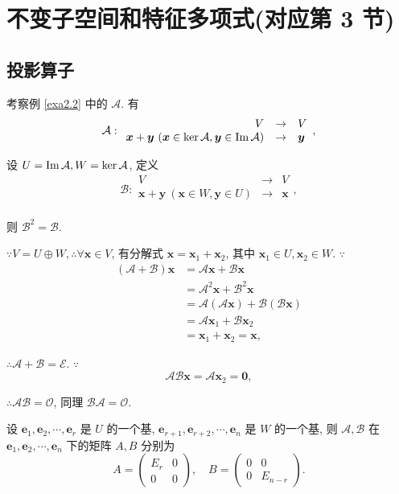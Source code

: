 \documentclass[color=black,device=normal,lang=cn,mode=geye]{elegantnote}
\begin{document}
\section{不变子空间和特征多项式(对应第 3 节)}
\subsection{投影算子}
考察例 \ref{exa2.2} 中的 $\mathcal{A}$. 有
\[\mathcal{A}:\begin{array}{rcl}
    V & \to & V \\
    \boldsymbol{x}+\boldsymbol{y}\ (\boldsymbol{x}\in\ker\mathcal{A},\boldsymbol{y}\in\im \mathcal{A}) & \to & \boldsymbol{y} \\
\end{array},\]

设 $U=\operatorname{Im} \mathcal{A},W=\ker\mathcal{A}$, 定义
\[\mathcal{B}:\begin{array}{rcl}
    V & \to & V \\
    \boldsymbol{x}+\boldsymbol{y}\ (\boldsymbol{x}\in W,\boldsymbol{y}\in U) & \to & \boldsymbol{x} \\
\end{array},\]

则 $\mathcal{B}^2=\mathcal{B}$.

$\because V=U\oplus W,\therefore\forall\boldsymbol{x}\in V$, 有分解式 $\boldsymbol{x}=\boldsymbol{x}_1+\boldsymbol{x}_2$, 其中 $\boldsymbol{x}_1\in U,\boldsymbol{x}_2\in W$. $\because$
\begin{align*}
    (\mathcal{A}+\mathcal{B})\boldsymbol{x} & =\mathcal{A}\boldsymbol{x}+\mathcal{B}\boldsymbol{x} \\
    & =\mathcal{A}^2\boldsymbol{x}+\mathcal{B}^2\boldsymbol{x} \\
    & =\mathcal{A}(\mathcal{A}\boldsymbol{x})+\mathcal{B}(\mathcal{B}\boldsymbol{x}) \\
    & =\mathcal{A}\boldsymbol{x}_1+\mathcal{B}\boldsymbol{x}_2 \\
    & =\boldsymbol{x}_1+\boldsymbol{x}_2=\boldsymbol{x},
\end{align*}

$\therefore\mathcal{A}+\mathcal{B}=\mathcal{E}$. $\because$
\[\mathcal{A}\mathcal{B}\boldsymbol{x}=\mathcal{A}\boldsymbol{x}_2=\boldsymbol{0},\]

$\therefore\mathcal{A}\mathcal{B}=\mathcal{O}$, 同理 $\mathcal{B}\mathcal{A}=\mathcal{O}$.

设 $\boldsymbol{e}_1,\boldsymbol{e}_2,\cdots,\boldsymbol{e}_r$ 是 $U$ 的一个基, $\boldsymbol{e}_{r+1},\boldsymbol{e}_{r+2},\cdots,\boldsymbol{e}_n$ 是 $W$ 的一个基, 则 $\mathcal{A},\mathcal{B}$ 在 $\boldsymbol{e}_1,\boldsymbol{e}_2,\cdots,\boldsymbol{e}_n$ 下的矩阵 $A,B$ 分别为
\[A=\begin{pmatrix}
    E_r & 0 \\
    0 & 0
\end{pmatrix},\quad B=\begin{pmatrix}
    0 & 0 \\
    0 & E_{n-r}
\end{pmatrix}.\]
\end{document}

